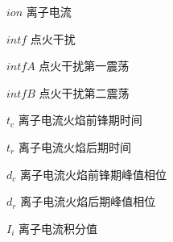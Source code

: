 \begin{denotation}
\item[$ion$] 离子电流
\item[$intf$] 点火干扰
\item[$intfA$] 点火干扰第一震荡
\item[$intfB$] 点火干扰第二震荡
\item[$t_c$] 离子电流火焰前锋期时间
\item[$t_r$] 离子电流火焰后期时间
\item[$d_c$] 离子电流火焰前锋期峰值相位
\item[$d_r$] 离子电流火焰后期峰值相位
\item[$I_i$] 离子电流积分值
\end{denotation}
